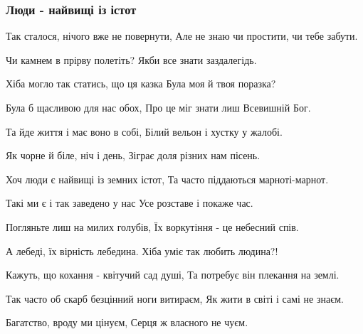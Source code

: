  
 
 

\subsubsection{Люди - найвищі із істот}

Так сталося, нічого вже не повернути,
Але не знаю чи простити, чи тебе забути.

Чи камнем в прірву полетіть?
Якби все знати заздалегідь.

Хіба могло так статись, що ця казка
Була моя й твоя поразка?

Була б щасливою для нас обох,
Про це міг знати лиш Всевишній Бог.

Та йде життя і має воно в собі,
Білий вельон і хустку у жалобі.

Як чорне й біле, ніч і день,
Зіграє доля різних нам пісень.

Хоч люди є найвищі із земних істот,
Та часто піддаються марноті-марнот.

Такі ми є і так заведено у нас
Усе розставе і покаже час.

Погляньте лиш на милих голубів,
Їх воркутіння - це небесний спів.

А лебеді, їх вірність лебедина.
Хіба уміє так любить людина?!

Кажуть, що кохання - квітучий сад душі,
Та потребує він плекання на землі.

Так часто об скарб безцінний ноги витираєм,
Як жити в світі і самі не знаєм.

Багатство, вроду ми цінуєм,
Серця ж власного не чуєм.
